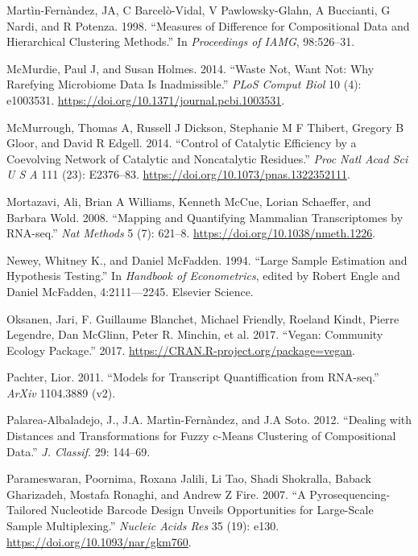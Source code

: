 \documentclass[onecolumn]{article}
\begin{document}
\leavevmode\hypertarget{ref-martin1998measures}{}%
Martìn-Fernàndez, JA, C Barcelò-Vidal, V Pawlowsky-Glahn, A Buccianti, G Nardi, and R Potenza. 1998. ``Measures of Difference for Compositional Data and Hierarchical Clustering Methods.'' In \emph{Proceedings of IAMG}, 98:526--31.

\leavevmode\hypertarget{ref-McMurdie:2014a}{}%
McMurdie, Paul J, and Susan Holmes. 2014. ``Waste Not, Want Not: Why Rarefying Microbiome Data Is Inadmissible.'' \emph{PLoS Comput Biol} 10 (4): e1003531. \url{https://doi.org/10.1371/journal.pcbi.1003531}.

\leavevmode\hypertarget{ref-mcmurrough:2014}{}%
McMurrough, Thomas A, Russell J Dickson, Stephanie M F Thibert, Gregory B Gloor, and David R Edgell. 2014. ``Control of Catalytic Efficiency by a Coevolving Network of Catalytic and Noncatalytic Residues.'' \emph{Proc Natl Acad Sci U S A} 111 (23): E2376--83. \url{https://doi.org/10.1073/pnas.1322352111}.

\leavevmode\hypertarget{ref-Mortazavi:2008}{}%
Mortazavi, Ali, Brian A Williams, Kenneth McCue, Lorian Schaeffer, and Barbara Wold. 2008. ``Mapping and Quantifying Mammalian Transcriptomes by RNA-seq.'' \emph{Nat Methods} 5 (7): 621--8. \url{https://doi.org/10.1038/nmeth.1226}.

\leavevmode\hypertarget{ref-Newey:1994}{}%
Newey, Whitney K., and Daniel McFadden. 1994. ``Large Sample Estimation and Hypothesis Testing.'' In \emph{Handbook of Econometrics}, edited by Robert Engle and Daniel McFadden, 4:2111---2245. Elsevier Science.

\leavevmode\hypertarget{ref-vegan:2017}{}%
Oksanen, Jari, F. Guillaume Blanchet, Michael Friendly, Roeland Kindt, Pierre Legendre, Dan McGlinn, Peter R. Minchin, et al. 2017. ``Vegan: Community Ecology Package.'' 2017. \url{https://CRAN.R-project.org/package=vegan}.

\leavevmode\hypertarget{ref-Pachter:2011}{}%
Pachter, Lior. 2011. ``Models for Transcript Quantiffication from RNA-seq.'' \emph{ArXiv} 1104.3889 (v2).

\leavevmode\hypertarget{ref-fernandez:2012}{}%
Palarea-Albaladejo, J., J.A. Martìn-Fernàndez, and J.A Soto. 2012. ``Dealing with Distances and Transformations for Fuzzy c-Means Clustering of Compositional Data.'' \emph{J. Classif.} 29: 144--69.

\leavevmode\hypertarget{ref-Parameswaran:2007aa}{}%
Parameswaran, Poornima, Roxana Jalili, Li Tao, Shadi Shokralla, Baback Gharizadeh, Mostafa Ronaghi, and Andrew Z Fire. 2007. ``A Pyrosequencing-Tailored Nucleotide Barcode Design Unveils Opportunities for Large-Scale Sample Multiplexing.'' \emph{Nucleic Acids Res} 35 (19): e130. \url{https://doi.org/10.1093/nar/gkm760}.
\end{document}
